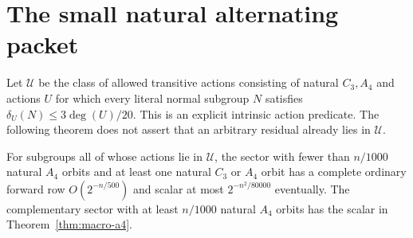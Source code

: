 \section{The small natural alternating packet}
\label{sec:packet-transfer}
Let $\mathcal U$ be the class of allowed transitive actions consisting
of natural $C_3,A_4$ and actions $U$ for which every literal normal
subgroup $N$ satisfies $\delta_U(N)\leq3\deg(U)/20$.
This is an explicit intrinsic action predicate. The following theorem
does not assert that an arbitrary residual already lies in $\mathcal U$.

\begin{theorem}\label{thm:low-a4-transfer}
For subgroups all of whose actions lie in $\mathcal U$, the sector
with fewer than $n/1000$ natural $A_4$ orbits and at least one
natural $C_3$ or $A_4$ orbit has a complete ordinary forward row
$O(2^{-n/500})$ and scalar at most $2^{-n^2/80000}$ eventually.
The complementary sector with at least $n/1000$ natural $A_4$
orbits has the scalar in Theorem~\ref{thm:macro-a4}.
\end{theorem}
